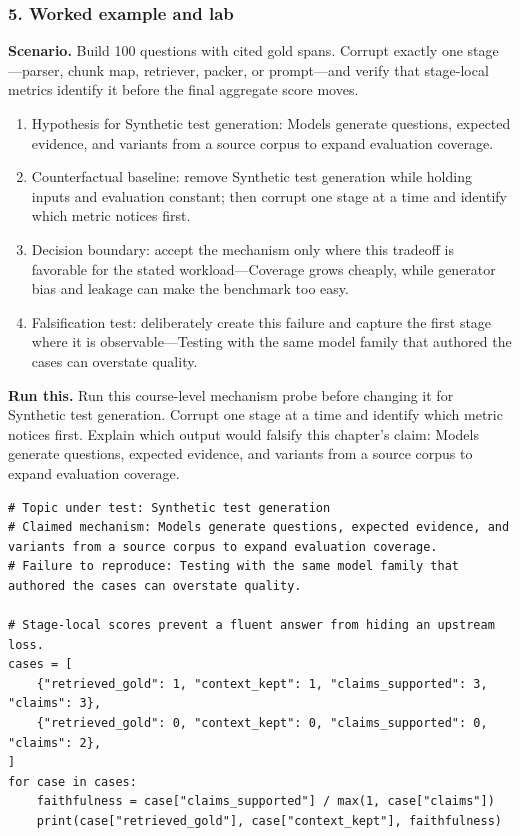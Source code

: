 \subsubsection*{5. Worked example and lab}
\textbf{Scenario.} Build 100 questions with cited gold spans. Corrupt exactly one stage—parser, chunk map, retriever, packer, or prompt—and verify that stage-local metrics identify it before the final aggregate score moves.
\begin{enumerate}
\item Hypothesis for Synthetic test generation: Models generate questions, expected evidence, and variants from a source corpus to expand evaluation coverage.
\item Counterfactual baseline: remove Synthetic test generation while holding inputs and evaluation constant; then corrupt one stage at a time and identify which metric notices first.
\item Decision boundary: accept the mechanism only where this tradeoff is favorable for the stated workload—Coverage grows cheaply, while generator bias and leakage can make the benchmark too easy.
\item Falsification test: deliberately create this failure and capture the first stage where it is observable—Testing with the same model family that authored the cases can overstate quality.
\end{enumerate}
\textbf{Run this.} Run this course-level mechanism probe before changing it for Synthetic test generation. Corrupt one stage at a time and identify which metric notices first. Explain which output would falsify this chapter's claim: Models generate questions, expected evidence, and variants from a source corpus to expand evaluation coverage.
\begin{Verbatim}[fontsize=\scriptsize]
# Topic under test: Synthetic test generation
# Claimed mechanism: Models generate questions, expected evidence, and variants from a source corpus to expand evaluation coverage.
# Failure to reproduce: Testing with the same model family that authored the cases can overstate quality.

# Stage-local scores prevent a fluent answer from hiding an upstream loss.
cases = [
    {"retrieved_gold": 1, "context_kept": 1, "claims_supported": 3, "claims": 3},
    {"retrieved_gold": 0, "context_kept": 0, "claims_supported": 0, "claims": 2},
]
for case in cases:
    faithfulness = case["claims_supported"] / max(1, case["claims"])
    print(case["retrieved_gold"], case["context_kept"], faithfulness)
\end{Verbatim}
